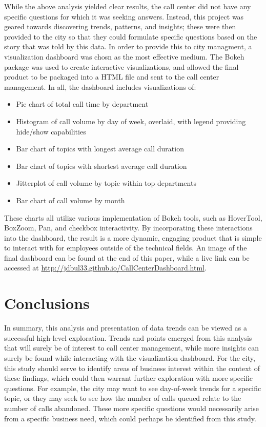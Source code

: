 \documentclass{article}
\begin{document}
While the above analysis yielded clear results, the call center did not have any specific questions for which it was seeking answers.  Instead, this project was geared towards discovering trends, patterns, and insights; these were then provided to the city so that they could formulate specific questions based on the story that was told by this data.  In order to provide this to city managment, a visualization dashboard was chosn as the most effective medium.  The Bokeh package was used to create interactive visualizations, and allowed the final product to be packaged into a HTML file and sent to the call center management.  In all, the dashboard includes visualizations of:

\begin{itemize}
  \item{Pie chart of total call time by department}
  \item{Histogram of call volume by day of week, overlaid, with legend providing hide/show capabilities}
  \item{Bar chart of topics with longest average call duration}
  \item{Bar chart of topics with shortest average call duration}
  \item{Jitterplot of call volume by topic within top departments}
  \item{Bar chart of call volume by month}
\end{itemize}

These charts all utilize various implementation of Bokeh tools, such as HoverTool, BoxZoom, Pan, and checkbox interactivity.  By incorporating these interactions into the dashboard, the result is a more dynamic, engaging product that is simple to interact with for employees outside of the technical fields.  An image of the final dashboard can be found at the end of this paper, while a live link can be accessed at \href{http://jdbul33.github.io/CallCenterDashboard.html}{http://jdbul33.github.io/CallCenterDashboard.html}.


\section{Conclusions}

In summary, this analysis and presentation of data trends can be viewed as a successful high-level exploration.  Trends and points emerged from this analysis that will surely be of interest to call center management, while more insights can surely be found while interacting with the visualization dashboard.  For the city, this study should serve to identify areas of business interest within the context of these findings, which could then warrant further exploration with more specific questions.  For example, the city may want to see day-of-week trends for a specific topic, or they may seek to see how the number of calls queued relate to the number of calls abandoned.  These more specific questions would necessarily arise from a specific business need, which could perhaps be identified from this study.
\end{document}

